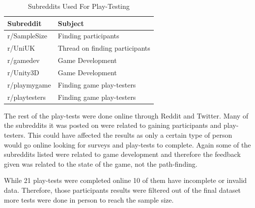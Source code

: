 \documentclass[journal]{IEEEtran}
\begin{document}
	\begin{table}[H]
		\centering
		\caption{Subreddits Used For Play-Testing}
		\label{table:Subreddits}
		\def\arraystretch{1.5}
		\begin{tabular}{ |l|l|}
			\hline
			\textbf{Subreddit}        & \textbf{Subject} \\     \hline
			r/SampleSize              & Finding participants  \\ \hline
			r/UniUK                   & Thread on finding participants \\ \hline
			r/gamedev                 & Game Development \\ \hline
			r/Unity3D                 & Game Development \\ \hline
			r/playmygame              & Finding game play-testers \\ \hline
			r/playtesters             & Finding game play-testers \\ \hline
		\end{tabular}
	\end{table}
	
	The rest of the play-tests were done online through Reddit and Twitter. Many of the subreddits it was posted on were related to gaining participants and play-testers. This could have affected the results as only a certain type of person would go online looking for surveys and play-tests to complete. Again some of the subreddits listed were related to game development and therefore the feedback given was related to the state of the game, not the path-finding.     
	
	While 21 play-tests were completed online 10 of them have incomplete or invalid data. Therefore, those participants results were filtered out of the final dataset more tests were done in person to reach the sample size.     
	
	
\end{document}
